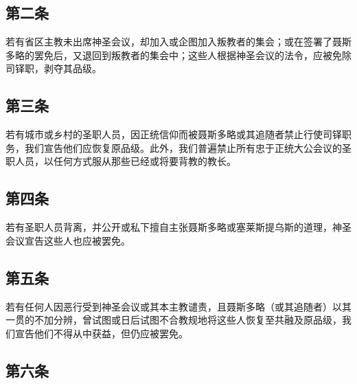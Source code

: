 
\subsection{第二条}

若有省区主教未出席神圣会议，却加入或企图加入叛教者的集会；或在签署了聂斯多略的罢免后，又退回到叛教者的集会中；这些人根据神圣会议的法令，应被免除司铎职，剥夺其品级。\par


\subsection{第三条}

若有城市或乡村的圣职人员，因正统信仰而被聂斯多略或其追随者禁止行使司铎职务，我们宣告他们应恢复原品级。此外，我们普遍禁止所有忠于正统大公会议的圣职人员，以任何方式服从那些已经或将要背教的教长。\par


\subsection{第四条}

若有圣职人员背离，并公开或私下擅自主张聂斯多略或塞莱斯提乌斯的道理，神圣会议宣告这些人也应被罢免。\par


\subsection{第五条}

若有任何人因恶行受到神圣会议或其本主教谴责，且聂斯多略（或其追随者）以其一贯的不加分辨，曾试图或日后试图不合教规地将这些人恢复至共融及原品级，我们宣告他们不得从中获益，但仍应被罢免。\par


\subsection{第六条}

